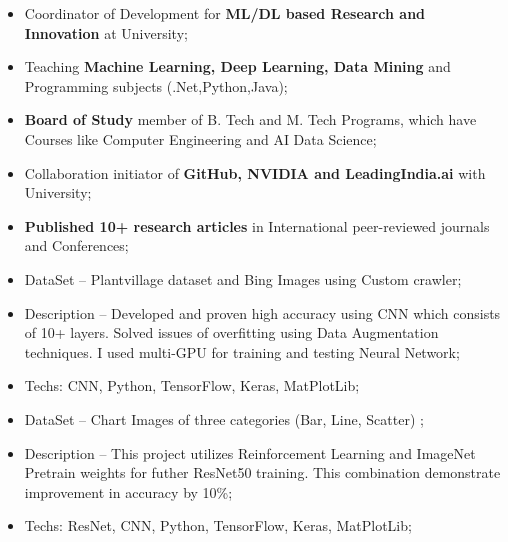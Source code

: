 \documentclass[10pt,a4paper]{altacv}
\begin{document}
\divider
%



\begin{itemize}
  \item Coordinator of Development for \textbf{ML/DL based Research and Innovation} at University;   
  \item Teaching \textbf{Machine Learning, Deep Learning, Data Mining} and Programming subjects (.Net,Python,Java);
  \item \textbf{Board of Study} member of B. Tech and M. Tech Programs, which have Courses like Computer Engineering and AI Data Science;  
  \item Collaboration initiator of \textbf{GitHub, NVIDIA and LeadingIndia.ai} with University;
  \item \textbf{Published 10+ research articles} in International peer-reviewed journals and Conferences; 
\end{itemize}


\medskip

\clearpage






\begin{itemize}
  \item DataSet -- Plantvillage dataset and Bing Images using Custom crawler;
  \item Description -- Developed and proven high accuracy using CNN which consists of 10+ layers. Solved issues of overfitting using Data Augmentation techniques. I used multi-GPU for training and testing Neural Network;
  \item Techs: CNN, Python, TensorFlow, Keras, MatPlotLib;
\end{itemize}

\divider

\begin{itemize}
  \item DataSet -- Chart Images of three categories (Bar, Line, Scatter) ;
  \item Description -- This project utilizes Reinforcement Learning and ImageNet Pretrain weights for futher ResNet50 training. This combination demonstrate improvement in accuracy by 10\%;
  \item Techs: ResNet, CNN, Python, TensorFlow, Keras, MatPlotLib;
\end{itemize}
\end{document}
